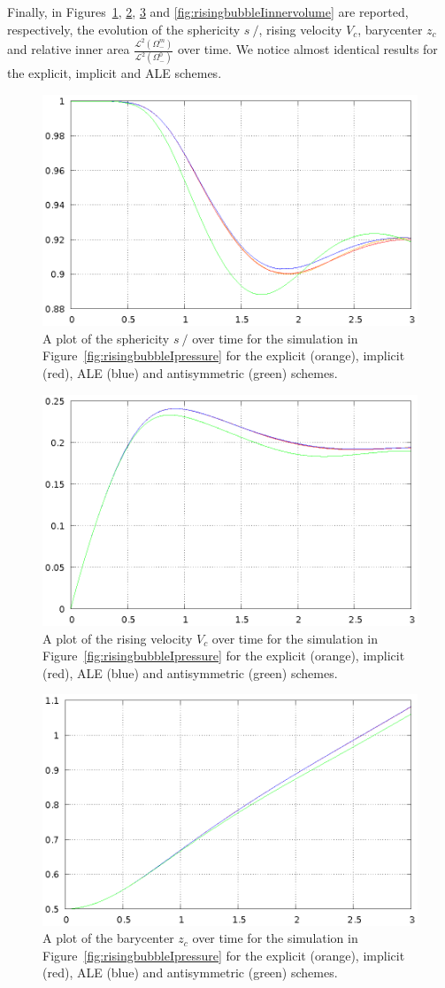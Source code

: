 \documentclass[a4paper,12pt,onecolumn]{article}
\newcommand{\strikes}{\mbox{$s\!\!\!\!\:/$}}
\begin{document}
Finally, in Figures~\ref{fig:risingbubbleIsphericity},
\ref{fig:risingbubbleIrisingvelocity}, \ref{fig:risingbubbleIbarycenter} and
\ref{fig:risingbubbleIinnervolume} are reported, respectively, the evolution of
the sphericity $\strikes$, rising velocity $V_c$, barycenter $z_c$ and relative
inner area $\frac{\mathcal{L}^2(\Omega^m_-)}{\mathcal{L}^2(\Omega^0_-)}$ over
time. We notice almost identical results for the explicit, implicit and ALE
schemes.
\begin{figure}[htbp]
\centering
\includegraphics[width=.45\textwidth]
{figures/rising_bubble_I_sphericity.ps}
\caption[Navier--Stokes rising bubble I sphericity]
{A plot of the sphericity $\strikes$ over time for the simulation in
Figure~\ref{fig:risingbubbleIpressure} for the explicit (orange), implicit
(red), ALE (blue) and antisymmetric (green) schemes.}
\label{fig:risingbubbleIsphericity}
\end{figure}

\begin{figure}[htbp]
\centering
\includegraphics[width=.45\textwidth]
{figures/rising_bubble_I_rising_velocity.ps}
\caption[Navier--Stokes rising bubble I rising velocity]
{A plot of the rising velocity $V_c$ over time for the simulation in
Figure~\ref{fig:risingbubbleIpressure} for the explicit (orange), implicit
(red), ALE (blue) and antisymmetric (green) schemes.}
\label{fig:risingbubbleIrisingvelocity}
\end{figure}

\begin{figure}[htbp]
\centering
\includegraphics[width=.45\textwidth]
{figures/rising_bubble_I_barycenter.ps}
\caption[Navier--Stokes rising bubble I barycenter]
{A plot of the barycenter $z_c$ over time for the simulation in
Figure~\ref{fig:risingbubbleIpressure} for the explicit (orange), implicit
(red), ALE (blue) and antisymmetric (green) schemes.}
\label{fig:risingbubbleIbarycenter}
\end{figure}
\end{document}
